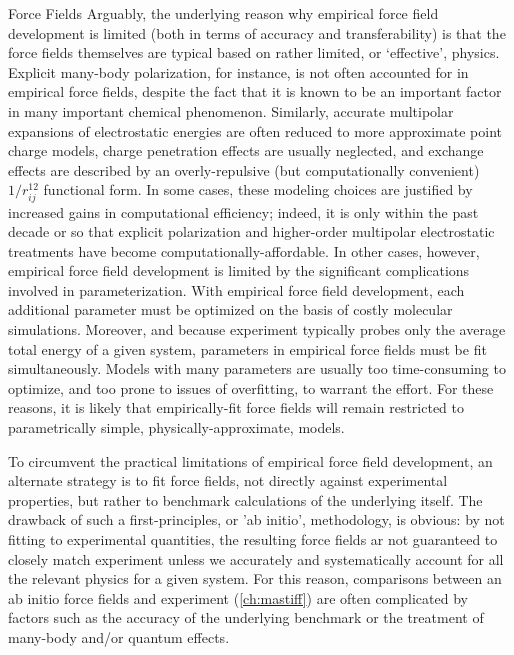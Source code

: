 \begin{section}{Force Fields}
Arguably, the underlying reason why empirical force field development is
limited (both in terms of accuracy and transferability) is that the
force fields themselves are typical based on rather limited, or `effective',
physics.
\cite{Parker2015,Sherrill2009,Zgarbova2010}
Explicit many-body polarization, for instance, is not often accounted for in
empirical force fields, despite the fact that it is known to be an important
factor in many important chemical phenomenon.
\cite{Cisneros2016a,Freddolino2010,Cieplak2009}
Similarly, accurate multipolar expansions of electrostatic energies are often
reduced to more approximate point charge models,\cite{Cardamone2014} 
charge penetration effects are usually neglected,
\cite{Parker2015,Sherrill2009}
and exchange effects are described by an overly-repulsive (but computationally
convenient) $1/r_{ij}^{12}$ functional form.
\cite{Abrahamson1963,Mackerell2004,Parker2015,Sherrill2009,Zgarbova2010}
In some cases, these modeling choices are justified by increased gains in
computational efficiency; indeed, it is only within the past decade or so that
explicit polarization and higher-order multipolar electrostatic
treatments have become computationally-affordable.
\cite{Albaugh2016,Cardamone2014,Cieplak2009,Simmonett2015,Simmonett2016,Demerdash2014}
In other cases, however, empirical force field development is limited by the
significant complications involved in parameterization.
With empirical force field development, each additional parameter must be
optimized on the basis of costly molecular simulations.
Moreover, and because experiment typically probes 
only the average total energy of a given system, parameters in empirical
force fields must be fit simultaneously. Models with many parameters are
usually too time-consuming to optimize, and too prone to issues of
overfitting,\cite{Hawkins2004} to warrant the effort. For these reasons, it is
likely that empirically-fit force fields will remain restricted to
parametrically simple, physically-approximate, models.

To circumvent the practical limitations of empirical force field development,
an alternate strategy is to fit force fields, not directly against
experimental properties, but rather to benchmark calculations of the
underlying \pes itself.\cite{Stone2007} 
The drawback of such a first-principles, or 'ab initio', methodology, is
obvious: by not fitting to experimental quantities, 
the resulting force fields ar not guaranteed to closely match experiment unless we
accurately and systematically account for all the relevant physics for a given
system.
For this reason, comparisons between an ab initio force fields and experiment (\cref{ch:mastiff})
are often complicated by factors such as
the accuracy of the underlying
benchmark \pes or the treatment of many-body and/or quantum effects.
\cite{Johnson2009,Taylor2016,Chalasinski2000}


\end{section}
